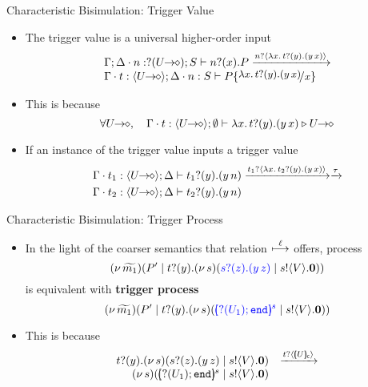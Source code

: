 \documentclass{beamer}
\newcommand{\prcolor}[1]{{\color{blue} #1}}
\begin{document}
	\begin{frame}{Characteristic Bisimulation: Trigger Value}
		\begin{itemize}
			\item	The trigger value is a universal higher-order input
				\[
				\begin{array}{l}
					\Gamma; \Delta \cat n: \btinp{\shot{U}} S \proves \binp{n}{x} P
					\by{\bactinp{n}{\abs{x}{\binp{t}{y} (\appl{y}{x})}}}\\
					\Gamma \cat t: \chtype{\shot{U}}; \Delta \cat n: S %
					\proves P \subst{\abs{x}{\binp{t}{y} (\appl{y}{x})}}{x} 
				\end{array}
				\]
			\item	This is because
				\[
					\forall \shot{U}, \quad \Gamma \cat t: \chtype{\shot{U}}; \es %
					\proves \abs{x}{\binp{t}{y} (\appl{y}{x})} \hastype \shot{U}
				\]

			\item	If an instance of the trigger value inputs a trigger value
				\begin{eqnarray*}
					\Gamma \cat t_1: \chtype{\shot{U}}; \Delta
					\proves \binp{t_1}{y} (\appl{y}{n}) & \by{\bactinp{t_1}{\abs{x}{\binp{t_2}{y} (\appl{y}{x})}}} \by{\tau}\\
					\Gamma \cat t_2: \chtype{\shot{U}}; \Delta
					\proves \binp{t_2}{y} (\appl{y}{n}) %
				\end{eqnarray*}
		\end{itemize}
	\end{frame}

	\begin{frame}{Characteristic Bisimulation: Trigger Process}
		\begin{itemize}
			\item	In the light of the coarser semantics that
				relation $\stackrel{\ell}{\longmapsto}$ offers, process
				\[
					\newsp{\widetilde{m_1}}{P' \Par \binp{t}{y}\newsp{s}{\prcolor{\binp{s}{z} (\appl{y}{z})} \Par \bout{s}{V} \inact}}
				\]
				is equivalent with {\bf trigger process}
				\[
					\newsp{\widetilde{m_1}}{P' \Par \binp{t}{y}\newsp{s}{\prcolor{\mapchar{\btinp{U_1} \tinact}{s}} \Par \bout{s}{V} \inact}}
				\]
			\item	This is because
				\[
					\begin{array}{rl}
						\binp{t}{y} \newsp{s}{\binp{s}{z} (\appl{y}{z}) \Par \bout{s}{V} \inact}
						&\by{\bactinp{t}{\omapchar{U}}}\\
						\newsp{s}{\mapchar{\btinp{U_1} \tinact}{s} \Par \bout{s}{V} \inact} %
					\end{array}
				\]
		\end{itemize}
	\end{frame}
\end{document}
